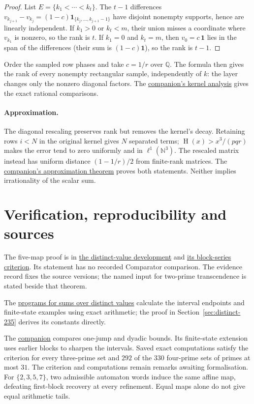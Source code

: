 \documentclass[11pt]{article}
\newcommand{\distinctheighturl}{https://github.com/wcook04/plectis-erdos/tree/10178c4df40cb27d83b5ebb1ec337dd588b82998/research/experiments/erdos269/distinct_height}
\newcommand{\distinctheightlean}{https://github.com/wcook04/plectis-erdos/blob/5154f4c46fa5d5ab2cff8df857a0b10f310cbeeb/lean/ErdosProblems/Erdos269/DistinctHeightIrrationality.lean}
\newcommand{\distinctheightblocklean}{https://github.com/wcook04/plectis-erdos/blob/5154f4c46fa5d5ab2cff8df857a0b10f310cbeeb/lean/ErdosProblems/Erdos269/DistinctHeightBlockRadix.lean}
\newcommand{\hgt}{\operatorname{H}}
\newcommand{\longrecord}[2]{\href{erdos269-running-lcm-reasoning-surface.pdf\##1}{#2}}
\begin{document}
\begin{proof}
List $E=\{k_1<\cdots<k_t\}$.  The $t-1$ differences
$v_{k_{j+1}}-v_{k_j}=(1-c)\mathbf 1_{\{k_j,\ldots,k_{j+1}-1\}}$
have disjoint nonempty supports, hence are linearly independent.
If $k_1>0$ or $k_t<m$, their union misses a coordinate where $v_{k_1}$ is
nonzero, so the rank is $t$.
If $k_1=0$ and $k_t=m$, then $v_0=c\,\mathbf 1$ lies in the span of the
differences (their sum is $(1-c)\mathbf 1$), so the rank is $t-1$.
\end{proof}


Order the sampled row phases and take $c=1/r$ over $\mathbb Q$.
The formula then gives the rank of every nonempty rectangular sample,
independently of $k$: the layer changes only the nonzero diagonal
factors. The \longrecord{r3-rank}{companion's kernel analysis} gives the
exact rational comparisons.


\paragraph{Approximation.}
The diagonal rescaling preserves rank but removes the kernel's decay.
Retaining rows $i<N$ in the original kernel gives $N$ separated terms;
$\hgt(x)>x^3/(pqr)$ makes the error tend to zero uniformly and in
$\ell^1(\mathbb N^3)$. The rescaled matrix instead has uniform distance
$(1-1/r)/2$ from finite-rank matrices. The
\longrecord{r3-approximation}{companion's approximation theorem} proves
both statements. Neither implies irrationality of the scalar sum.


\section{Verification, reproducibility and sources}\label{app:sources}
\evidenceparagraph{\evidencerecordurl}
The five-map proof is in \href{\distinctheightlean}{the distinct-value
development} and \href{\distinctheightblocklean}{its block-series
criterion}. Its statement has no recorded Comparator comparison. The
evidence record fixes the source versions; the named input for
two-prime transcendence is stated beside that theorem.

The \href{\distinctheighturl}{programs for sums over distinct values} calculate the
interval endpoints and finite-state examples using exact arithmetic;
the proof in Section~\ref{sec:distinct-235} derives its constants directly.

The \longrecord{r3-five-maps}{companion} compares one-jump and dyadic bounds.
Its finite-state extension uses earlier blocks to sharpen the intervals.
Saved exact computations satisfy the criterion for every three-prime set
and $292$ of the $330$ four-prime sets of primes at most $31$. The criterion
and computations remain remarks awaiting formalisation.
For $\{2,3,5,7\}$, two admissible automaton words induce the same affine map,
defeating first-block recovery at every refinement. Equal maps alone do
not give equal arithmetic tails.
\end{document}

